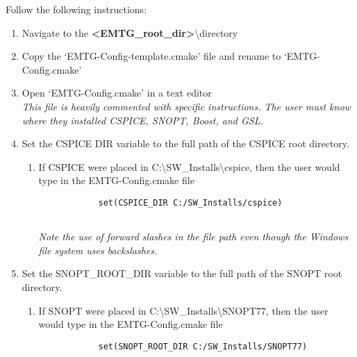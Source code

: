 
Follow the following instructions:
\begin{enumerate}
	\item Navigate to the \textbf{\textless EMTG\_root\_dir\textgreater}\textbackslash directory
	\item Copy the `EMTG-Config-template.cmake' file and rename to `EMTG-Config.cmake'
	\item Open `EMTG-Config.cmake' in a text editor \\ \emph{This file is heavily commented with specific instructions. The user must know where they installed CSPICE, SNOPT, Boost, and GSL.}
	\item Set the CSPICE DIR variable to the full path of the CSPICE root directory.
	\begin{enumerate}
		\item If CSPICE were placed in C:\textbackslash SW\_Installs\textbackslash cspice, then the user would type in the EMTG-Config.cmake file \\
		\begin{verbatim}
			set(CSPICE_DIR C:/SW_Installs/cspice)
			 
		\end{verbatim}
		
		\emph{Note the use of forward slashes in the file path even though the Windows file system uses backslashes.}
	\end{enumerate}
	\item Set the SNOPT\_ROOT\_DIR variable to the full path of the SNOPT root directory.
	\begin{enumerate}
		\item If SNOPT  were placed in C:\textbackslash SW\_Installs\textbackslash SNOPT77, then the user would type in the EMTG-Config.cmake file \\
		\begin{verbatim}
			set(SNOPT_ROOT_DIR C:/SW_Installs/SNOPT77)
			 
		\end{verbatim}
		

\end{enumerate}
\end{enumerate}
